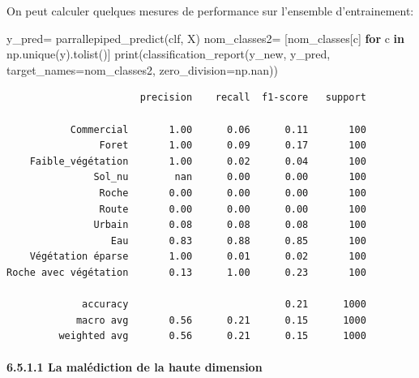 \documentclass[
]{article}
\newenvironment{Shaded}{}{}
\newcommand{\BuiltInTok}[1]{\textcolor[rgb]{0.00,0.50,0.00}{#1}}
\newcommand{\ControlFlowTok}[1]{\textcolor[rgb]{0.00,0.44,0.13}{\textbf{#1}}}
\newcommand{\KeywordTok}[1]{\textcolor[rgb]{0.00,0.44,0.13}{\textbf{#1}}}
\newcommand{\NormalTok}[1]{#1}
\newcommand{\OperatorTok}[1]{\textcolor[rgb]{0.40,0.40,0.40}{#1}}
\begin{document}
On peut calculer quelques mesures de performance sur l'ensemble
d'entrainement:

\label{2953ed7a}
\label{cb23}
\begin{Shaded}
\begin{Highlighting}[]
\NormalTok{y\_pred}\OperatorTok{=}\NormalTok{ parrallepiped\_predict(clf, X)}
\NormalTok{nom\_classes2}\OperatorTok{=}\NormalTok{ [nom\_classes[c] }\ControlFlowTok{for}\NormalTok{ c }\KeywordTok{in}\NormalTok{ np.unique(y).tolist()]}
\BuiltInTok{print}\NormalTok{(classification\_report(y\_new, y\_pred, target\_names}\OperatorTok{=}\NormalTok{nom\_classes2, zero\_division}\OperatorTok{=}\NormalTok{np.nan))}
\end{Highlighting}
\end{Shaded}

\begin{verbatim}
                       precision    recall  f1-score   support

           Commercial       1.00      0.06      0.11       100
                Foret       1.00      0.09      0.17       100
    Faible_végétation       1.00      0.02      0.04       100
               Sol_nu        nan      0.00      0.00       100
                Roche       0.00      0.00      0.00       100
                Route       0.00      0.00      0.00       100
               Urbain       0.08      0.08      0.08       100
                  Eau       0.83      0.88      0.85       100
    Végétation éparse       1.00      0.01      0.02       100
Roche avec végétation       0.13      1.00      0.23       100

             accuracy                           0.21      1000
            macro avg       0.56      0.21      0.15      1000
         weighted avg       0.56      0.21      0.15      1000
\end{verbatim}

\paragraph{\texorpdfstring{{6.5.1.1} La malédiction de la haute
dimension}{6.5.1.1 La malédiction de la haute dimension}}\label{la-maluxe9diction-de-la-haute-dimension}
\end{document}
